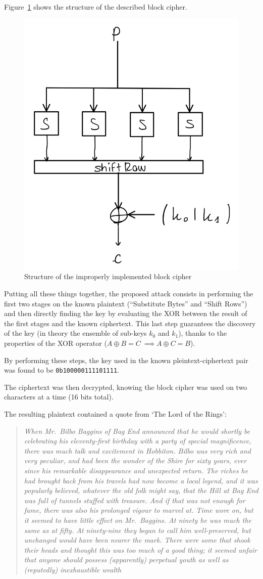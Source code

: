 \documentclass[12pt]{article}
\begin{document}
Figure~\ref{fig:3.1} shows the structure of the described block cipher.

\begin{figure} [ht]
   \centering
   \includegraphics[width = .5\linewidth]{improper_block_scheme.jpeg}
   \caption{Structure of the improperly implemented block cipher}
   \label{fig:3.1}
\end{figure}

Putting all these things together, the proposed attack consists in performing the first two stages on the known plaintext (``Substitute Bytes'' and ``Shift Rows'') and then directly finding the key by evaluating the XOR between the result of the first stages and the known ciphertext. This last step guarantees the discovery of the key (in theory the ensemble of sub-keys $k_0$ and $k_1$), thanks to the properties of the XOR operator ($A\oplus B = C\ \implies A\oplus C = B$).

By performing these steps, the key used in the known pleintext-ciphertext pair was found to be \verb|0b100000111101111|.

The ciphertext was then decrypted, knowing the block cipher was used on two characters at a time (16 bits total).

The resulting plaintext contained a quote from `The Lord of the Rings':

\begin{quote}
   \textit{When Mr.\ Bilbo Baggins of Bag End announced that he would shortly be celebrating his eleventy-first birthday with a party of special magnificence, there was much talk and excitement in Hobbiton. 
   Bilbo was very rich and very peculiar, and had been the wonder of the Shire for sixty years, ever since his remarkable disappearance and unexpected return. 
   The riches he had brought back from his travels had now become a local legend, and it was popularly believed, whatever the old folk might say, that the Hill at Bag End was full of tunnels stuffed with treasure. 
   And if that was not enough for fame, there was also his prolonged vigour to marvel at. Time wore on, but it seemed to have little effect on Mr.\ Baggins.
   At ninety he was much the same as at fifty. 
   At ninety-nine they began to call him well-preserved, but unchanged would have been nearer the mark. 
   There were some that shook their heads and thought this was too much of a good thing; it seemed unfair that anyone should possess (apparently) perpetual youth as well as (reputedly) inexhaustible wealth}
\end{quote}
\end{document}
